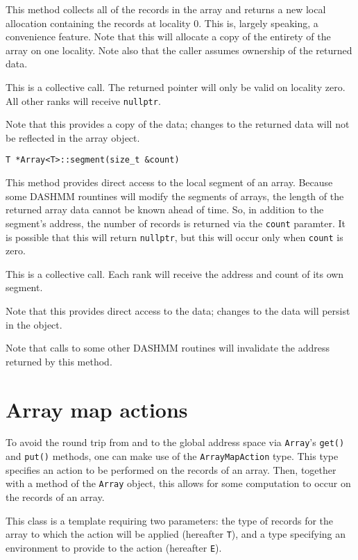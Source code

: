 \noindent This method collects all of the records in the array and returns a
new local
allocation containing the records at locality 0. This is, largely speaking, a
convenience feature. Note that this will allocate a copy of the entirety of the
array on one locality. Note also that the caller assumes ownership of the
returned data.

This is a collective call. The returned pointer will only be valid on locality
zero. All other ranks will receive \texttt{nullptr}.

Note that this provides a copy of the data; changes to the returned data will
not be reflected in the array object.

\begin{lstlisting}
T *Array<T>::segment(size_t &count)
\end{lstlisting}

\noindent This method provides direct access to the local segment of an array.
Because some DASHMM rountines will modify the segments of arrays, the length
of the returned array data cannot be known ahead of time. So, in addition to
the segment's address, the number of records is returned via the \texttt{count}
paramter. It is possible that this will return \texttt{nullptr}, but this will
occur only when \texttt{count} is zero.

This is a collective call. Each rank will receive the address and count of its
own segment.

Note that this provides direct access to the data; changes to the data will
persist in the object.

Note that calls to some other DASHMM routines will invalidate the address
returned by this method.


\section{Array map actions}

To avoid the round trip from and to the global address space via
\texttt{Array}'s \texttt{get()} and \texttt{put()} methods, one can make use
of the \texttt{ArrayMapAction} type. This type specifies an action to be
performed on the records of an array. Then, together with a method of the
\texttt{Array} object, this allows for some computation to occur on the
records of an array.

This class is a template requiring two parameters: the type of records for
the array to which the action will be applied (hereafter \texttt{T}), and a
type specifying an environment to provide to the action (hereafter \texttt{E}).

